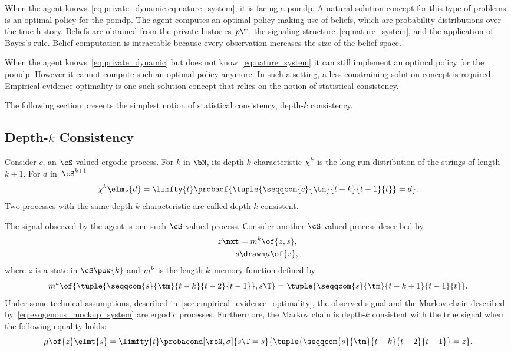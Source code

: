 When the agent knows~\cref{eq:private_dynamic,eq:nature_system}, it is facing a \ac{pomdp}.
A natural solution concept for this type of problems is an optimal policy for the \ac{pomdp}.
The agent computes an optimal policy making use of beliefs, which are probability distributions over the true history.
Beliefs are obtained from the private histories~\(p\T\), the signaling structure~\cref{eq:nature_system}, and the application of Bayes's rule.
Belief computation is intractable because every observation increases the size of the belief space.

When the agent knows~\cref{eq:private_dynamic} but does not know~\cref{eq:nature_system} it can still implement an optimal policy for the \ac{pomdp}.
However it cannot compute such an optimal policy anymore.
In such a setting, a less constraining solution concept is required.
Empirical-evidence optimality is one such solution concept that relies on the notion of statistical consistency.

The following section presents the simplest notion of statistical consistency, depth-\(k\) consistency.

\subsection{Depth-\texorpdfstring{\(k\)}{k} Consistency}
\label{sec:depth-k_consistency}

Consider \(c\), an \(\cS\)-valued ergodic process.
For \(k\) in \(\bN\), its depth-\(k\) characteristic \(\chi^k\) is the long-run distribution of the strings of length \(k + 1\).
For \(d\) in~\(\cS^{k + 1}\)
\begin{equation}
\label{eq:depth-k_characteristic}
\chi\K\elmt{d} = \limfty{t} \probaof{\tuple{\seqqcom{c}{\tm}{t - k}{t - 1}{t}} = d}.
\end{equation}
Two processes with the same depth-\(k\) characteristic are called depth-\(k\) consistent.

The signal observed by the agent is one such \(\cS\)-valued process.
Consider another \(\cS\)-valued process described by
\begin{subequations}
\label{eq:exogenous_mockup_system}
\begin{align}
\label{eq:exogenous_mockup_model}
z\nxt &= m\K \of{z, s}, \\
\label{eq:exogenous_mockup_predictor}
s &\drawn \mu \of{z},
\end{align}
\end{subequations}
where \(z\) is a state in \(\cS\pow{k}\) and \(m^k\) is the length-\(k\)--memory function defined by
\[
m\K \of{\tuple{\seqqcom{s}{\tm}{t - k}{t - 2}{t - 1}}, s\T} = \tuple{\seqqcom{s}{\tm}{t - k + 1}{t - 1}{t}}.
\]
Under some technical assumptions, described in~\cref{sec:empirical_evidence_optimality}, the observed signal and the Markov chain described by~\cref{eq:exogenous_mockup_system} are ergodic processes.
Furthermore, the Markov chain is depth-\(k\) consistent with the true signal when the following equality holds:
\[
\mu \of{z} \elmt{s} = \limfty{t}\probacond[\rbN, \sigma]{s\T = s}{\tuple{\seqqcom{s}{\tm}{t - k}{t - 2}{t - 1}} = z}.
\]

